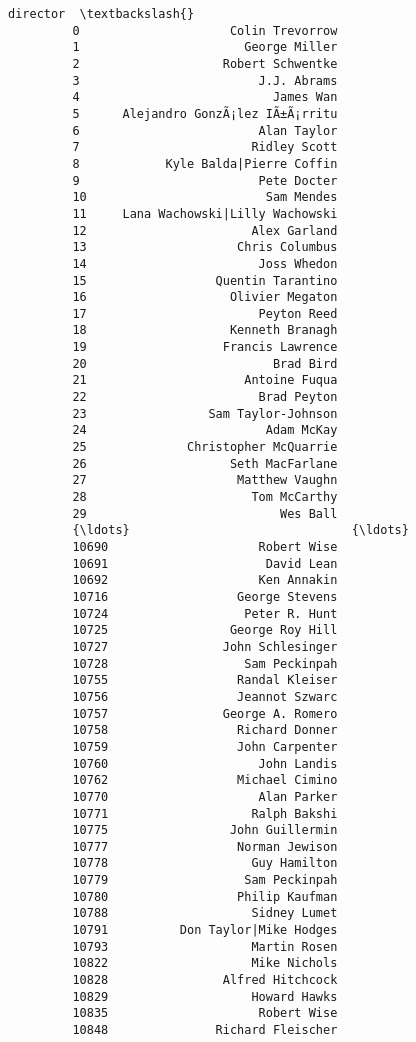 \documentclass[11pt]{article}
\begin{document}
\begin{Verbatim}[commandchars=\\\{\}]
                                      director  \textbackslash{}
         0                     Colin Trevorrow   
         1                       George Miller   
         2                    Robert Schwentke   
         3                         J.J. Abrams   
         4                           James Wan   
         5      Alejandro GonzÃ¡lez IÃ±Ã¡rritu   
         6                         Alan Taylor   
         7                        Ridley Scott   
         8            Kyle Balda|Pierre Coffin   
         9                         Pete Docter   
         10                         Sam Mendes   
         11     Lana Wachowski|Lilly Wachowski   
         12                       Alex Garland   
         13                     Chris Columbus   
         14                        Joss Whedon   
         15                  Quentin Tarantino   
         16                    Olivier Megaton   
         17                        Peyton Reed   
         18                    Kenneth Branagh   
         19                   Francis Lawrence   
         20                          Brad Bird   
         21                      Antoine Fuqua   
         22                        Brad Peyton   
         23                 Sam Taylor-Johnson   
         24                         Adam McKay   
         25              Christopher McQuarrie   
         26                    Seth MacFarlane   
         27                     Matthew Vaughn   
         28                       Tom McCarthy   
         29                           Wes Ball   
         {\ldots}                               {\ldots}   
         10690                     Robert Wise   
         10691                      David Lean   
         10692                     Ken Annakin   
         10716                  George Stevens   
         10724                   Peter R. Hunt   
         10725                 George Roy Hill   
         10727                John Schlesinger   
         10728                   Sam Peckinpah   
         10755                  Randal Kleiser   
         10756                  Jeannot Szwarc   
         10757                George A. Romero   
         10758                  Richard Donner   
         10759                  John Carpenter   
         10760                     John Landis   
         10762                  Michael Cimino   
         10770                     Alan Parker   
         10771                    Ralph Bakshi   
         10775                 John Guillermin   
         10777                  Norman Jewison   
         10778                    Guy Hamilton   
         10779                   Sam Peckinpah   
         10780                  Philip Kaufman   
         10788                    Sidney Lumet   
         10791          Don Taylor|Mike Hodges   
         10793                    Martin Rosen   
         10822                    Mike Nichols   
         10828                Alfred Hitchcock   
         10829                    Howard Hawks   
         10835                     Robert Wise   
         10848               Richard Fleischer   
         

\end{Verbatim}
\end{document}
